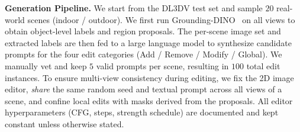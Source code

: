 \vspace{1mm}
\noindent\textbf{Generation Pipeline.}
We start from the DL3DV test set and sample $20$ real-world scenes (indoor / outdoor). We first run Grounding-DINO~\cite{liu2024groundingdinomarryingdino} on all views to obtain object-level labels and region proposals. The per-scene image set and extracted labels are then fed to a large language model to synthesize candidate prompts for the four edit categories (Add / Remove / Modify / Global). 
We manually vet and keep $5$ valid prompts per scene, resulting in $100$ total edit instances. To ensure multi-view consistency during editing, we fix the 2D image editor, \emph{share} the same random seed and textual prompt across all views of a scene, and confine local edits with masks derived from the proposals. All editor hyperparameters (CFG, steps, strength schedule) are documented and kept constant unless otherwise stated.

